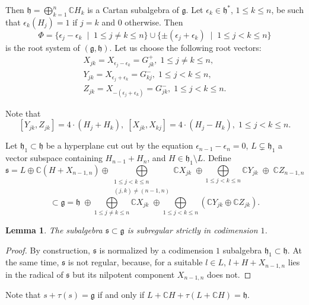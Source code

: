 \documentclass[10pt]{article}
\newtheorem{lemma}[theorem]{Lemma}
\begin{document}
Then $\mathfrak{h}=\bigoplus\limits_{k=1}^{n} \mathbb C H_{k}$ is a Cartan subalgebra of $\mathfrak{g}$. Let ${\epsilon}_k \in {\mathfrak{h}}^{*}$, $1\leq k\leq n$, be such that ${\epsilon}_k (H_j)=1$ if $j=k$ and $0$ otherwise. Then
$$
\Phi = \{ {\epsilon}_j - {\epsilon}_k \; \mid \; 1\leq j\neq k\leq n  \} \cup \{ \pm ({\epsilon}_j + {\epsilon}_k) \; \mid \; 1\leq j< k\leq n  \}
$$
is the root system of $(\mathfrak{g},\mathfrak{h})$. Let us choose the following root vectors: 
\begin{align*}
X_{jk}=X_{{\epsilon}_j-{\epsilon}_k}=G_{jk}^{+},\; 1\leq j\neq k \leq n,\\
Y_{jk}=X_{{\epsilon}_j+{\epsilon}_k}=G_{kj}^{-},\; 1\leq j< k \leq n,\\
Z_{jk}=X_{-({\epsilon}_j+{\epsilon}_k)}=G_{jk}^{-},\; 1\leq j< k \leq n.
\end{align*} 

Note that 
$$
[Y_{jk},Z_{jk}]=4\cdot (H_j + H_k),\; [X_{jk},X_{kj}]=4\cdot (H_j - H_k),\; 1\leq j<k\leq n.
$$

Let $\mathfrak{h}_1\subset \mathfrak{h}$ be a hyperplane cut out by the equation ${\epsilon}_{n-1}-{\epsilon}_{n}=0$, $L\subsetneq \mathfrak{h}_1$ a vector subspace containing $H_{n-1}+H_n$, and $H\in \mathfrak{h}_1\setminus L$. Define
$$
\mathfrak{s}=L\oplus \mathbb C (H+X_{n-1,n})\oplus \bigoplus\limits_{\substack{1\leq j<k\leq n \\ (j,k)\neq (n-1,n)}} \mathbb C X_{jk}\;\oplus \bigoplus\limits_{1\leq j<k\leq n} \mathbb C Y_{jk}\;\oplus \; \mathbb C Z_{n-1,n}
$$
$$
\subset \mathfrak{g}=\mathfrak{h}\; \oplus \bigoplus\limits_{1\leq j\neq k\leq n} \mathbb C X_{jk}\; \oplus \bigoplus\limits_{1\leq j<k\leq n} \left( \mathbb C Y_{jk}\oplus \mathbb C Z_{jk} \right) .
$$

\begin{lemma}\label{lemma:22}
The subalgebra $\mathfrak{s}\subset \mathfrak{g}$ is subregular strictly in codimension $1$.
\end{lemma}

\begin{proof}

By construction, $\mathfrak{s}$ is normalized by a codimension $1$ subalgebra $\mathfrak{h}_1\subset \mathfrak{h}$. At the same time, $\mathfrak{s}$ is not regular, because, for a suitable $l\in L$, $l+H+X_{n-1,n}$ lies in the radical of $\mathfrak{s}$ but its nilpotent component $X_{n-1,n}$ does not. \end{proof}

Note that $s+\tau (s)=\mathfrak{g}$ if and only if $L+\mathbb C H + \tau (L+\mathbb C H)=\mathfrak{h}$.\\
\end{document}
